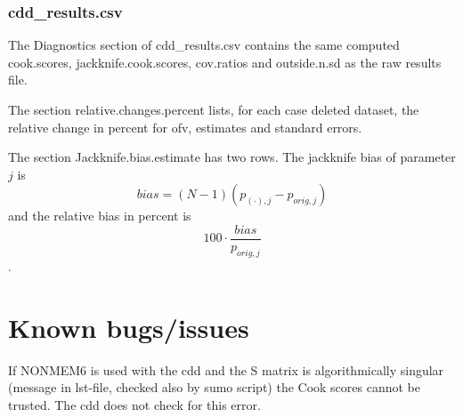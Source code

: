 \subsubsection*{cdd\_results.csv}
The Diagnostics section of
cdd\_results.csv contains the same computed cook.scores, jackknife.cook.scores, cov.ratios and
outside.n.sd as the raw results file.

The section relative.changes.percent lists, for each case deleted dataset, the relative change in percent
for ofv, estimates and standard errors.

The section Jackknife.bias.estimate
has two rows. The jackknife bias of parameter $j$ is \[bias=\left(N-1\right)\left(p_{(\cdot),j}-p_{orig,j}\right) \]
and the relative bias in percent is \[100\cdot\frac{bias}{p_{orig,j}}\].

\section{Known bugs/issues}

If NONMEM6 is used with the cdd and the S matrix is algorithmically singular (message in lst-file, checked also by sumo script) the Cook 
scores cannot be trusted. The cdd does not check for this error. 


